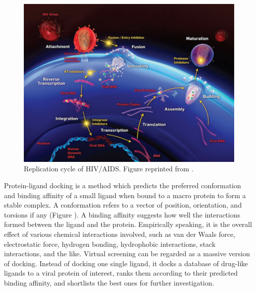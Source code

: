 \begin{figure}[h]
\centering
\includegraphics[width=\textwidth]{Background/HIV.jpg}
\caption{Replication cycle of HIV/AIDS. Figure reprinted from \citep{296}.}
\label{fig:HIV}
\end{figure}

Protein-ligand docking is a method which predicts the preferred conformation and binding affinity of a small ligand when bound to a macro protein to form a stable complex. A conformation refers to a vector of position, orientation, and torsions if any (Figure ). A binding affinity suggests how well the interactions formed between the ligand and the protein. Empirically speaking, it is the overall effect of various chemical interactions involved, such as van der Waals force, electrostatic force, hydrogen bonding, hydrophobic interactions, stack interactions, and the like. Virtual screening can be regarded as a massive version of docking. Instead of docking one single ligand, it docks a database of drug-like ligands to a viral protein of interest, ranks them according to their predicted binding affinity, and shortlists the best ones for further investigation.

